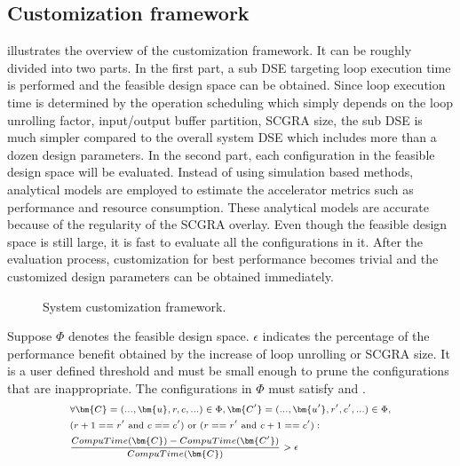 \subsection{Customization framework}
 illustrates the overview of the 
customization framework. It can be roughly divided into two 
parts. In the first part, a sub DSE targeting loop execution time 
is performed and the feasible design space can be obtained. Since loop 
execution time is determined by the operation scheduling 
which simply depends on the loop unrolling factor, input/output buffer partition, SCGRA size, the 
sub DSE is much simpler compared to the overall system DSE which includes more than a dozen design
parameters. In the second part, each configuration 
in the feasible design space will be evaluated. Instead of using simulation 
based methods, analytical models are employed to estimate the accelerator 
metrics such as performance and resource consumption. These analytical models are accurate because of the
regularity of the SCGRA overlay. Even though the feasible design space is still large, it is fast to evaluate 
all the configurations in it. After the evaluation process, customization for best performance
becomes trivial and the customized design parameters can be obtained immediately.

\begin{figure}[t]
\caption{System customization framework.}
\label{fig:customization-framework}
\end{figure}

Suppose $\Phi$ denotes the feasible design space. $\epsilon$ indicates the
percentage of the performance benefit obtained by the increase 
of loop unrolling or SCGRA size. It is a user defined 
threshold and must be small enough to prune the configurations that are 
inappropriate. The configurations in $\Phi$ must satisfy  
and . 
\begin{equation} \label{eq:cond1}
    \scriptsize
    \begin{split}
        &\forall \bm{C}=(...,\bm{u},r,c,...)\in \Phi, \bm{C'}=(...,\bm{u'},r',c',...) \in \Phi,\\ 
        & (r+1==r' \text{ and } c==c') \text{ or } (r==r' \text{ and } c+1==c'): \\ 
        &\frac{CompuTime(\bm{C})-CompuTime(\bm{C'})}{CompuTime(\bm{C})} > \epsilon \\
    \end{split}
\end{equation}

